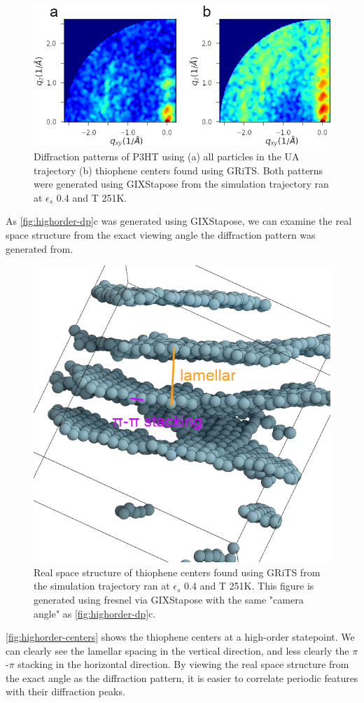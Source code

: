 \begin{figure}
    \centering
    \includegraphics[width=0.8\linewidth]{figures/p3ht_val/ua_vs_cg_dp.png}
    \caption{Diffraction patterns of P3HT using (a) all particles in the UA trajectory (b) thiophene centers found using GRiTS. Both patterns were generated using GIXStapose from the simulation trajectory ran at $\epsilon_{s}$ 0.4 and T 251K.}\label{fig:highorder-dp}
\end{figure}

As \autoref{fig:highorder-dp}c was generated using GIXStapose, we can examine the real space structure from the exact viewing angle the diffraction pattern was generated from. 
\begin{figure}
    \centering
    \includegraphics[width=0.8\linewidth]{figures/p3ht_val/scene_annotated.png}
    \caption{Real space structure of thiophene centers found using GRiTS from the simulation trajectory ran at $\epsilon_{s}$ 0.4 and T 251K. This figure is generated using fresnel via GIXStapose with the same "camera angle" as \autoref{fig:highorder-dp}c. }\label{fig:highorder-centers}
\end{figure}
\autoref{fig:highorder-centers} shows the thiophene centers at a high-order statepoint. We can clearly see the lamellar spacing in the vertical direction, and less clearly the $\pi$-$\pi$ stacking in the horizontal direction. By viewing the real space structure from the exact angle as the diffraction pattern, it is easier to correlate periodic features with their diffraction peaks.

